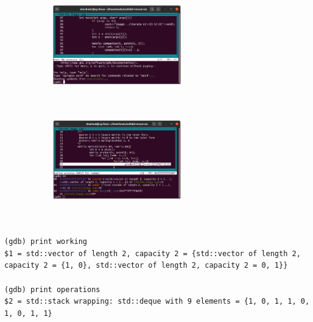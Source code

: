 \documentclass[a4paper,11pt]{article}
\numberwithin{definition}{section}
\numberwithin{mytheorem}{subsection}
\begin{document}
\begin{figure}[h]

\begin{subfigure}{210}
\includegraphics[width=210, height=4.5cm]{First Screenshot.png} 

\end{subfigure}
\begin{subfigure}{210}
\includegraphics[width=210, height=4.5cm]{Second Screenshot.png}

\end{subfigure}

\end{figure}
\\
\texttt{(gdb) print working}\\
\texttt{\$1 = std::vector of length 2, capacity 2 = \{std::vector of length 2, capacity 2 = \{1, 0\}, std::vector of length 2, capacity 2 = {0, 1}\}\}}\\\\
\texttt{(gdb) print operations}\\
\texttt{\$2 = std::stack wrapping: std::deque with 9 elements = \{1, 0, 1, 1, 0, 1, 0, 1, 1\}}\\\\

\end{document}
